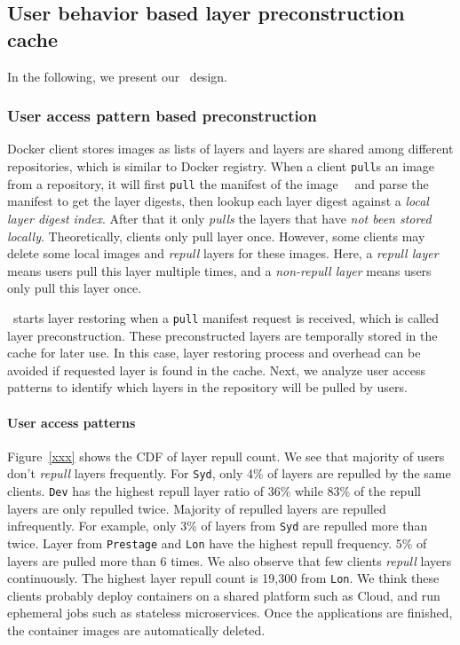 
\subsection{User behavior based layer preconstruction cache}
\label{sec:cache-design}

In the following, we present our \sysname~\preconstructcachename design.

\subsubsection{User access pattern based preconstruction}

Docker client stores images as lists of layers and layers are shared among different repositories, which is similar to Docker registry.
When a client \texttt{pull}s an image from a repository, 
it will first \texttt{pull} the manifest of the image~\cite{docker}~\cite{dockerworkload} and 
parse the manifest to get the layer digests,
then lookup each layer digest against a \emph{local layer digest index}.
After that it only \emph{pulls} the layers that have \emph{not been stored locally}.
Theoretically, clients only pull layer once. 
However, some clients may delete some local images and \emph{repull} layers for these images.
Here, a \emph{repull layer} means users pull this layer multiple times,
and a \emph{non-repull layer} means users only pull this layer once.

\preconstructcachename~starts layer restoring when a \texttt{pull} manifest request is received, which is called layer preconstruction.
These preconstructed layers are temporally stored in the cache for later use.
In this case, layer restoring process and overhead can be avoided if requested layer is found in the cache.
Next, we analyze user access patterns to identify which layers in the repository will be pulled by users.

\paragraph{User access patterns}
Figure~\ref{xxx} shows the CDF of layer repull count.
We see that majority of users don't \emph{repull} layers frequently.
For \texttt{Syd}, only 4\% of layers are repulled by the same clients.
\texttt{Dev} has the highest repull layer ratio of 36\% while 83\% of the repull layers are only repulled twice.
Majority of repulled layers are repulled infrequently.
For example, only 3\% of layers from \texttt{Syd} are repulled more than twice.
Layer from \texttt{Prestage} and \texttt{Lon} have the highest repull frequency.
5\% of layers are pulled more than 6 times.
We also observe that few clients \emph{repull} layers continuously.
The highest layer repull count is 19,300 from \texttt{Lon}.
We think these clients probably deploy containers on a shared platform such as Cloud,
and run ephemeral jobs such as stateless microservices. 
Once the applications are finished, the container images are automatically deleted.

